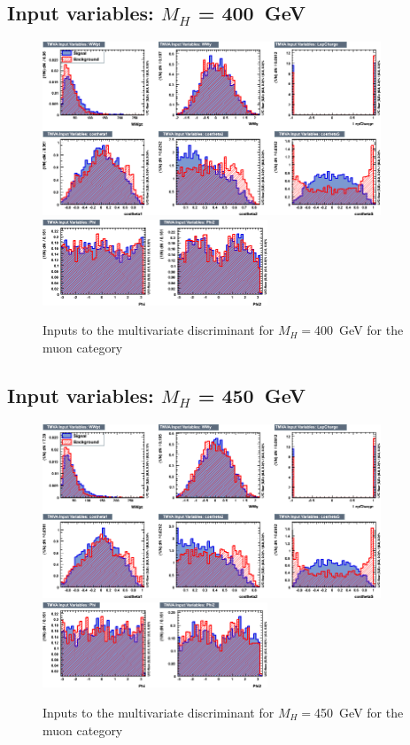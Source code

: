 \subsection{Input variables: \texorpdfstring{$M_H$}{M(H)} = 400~GeV}
\begin{figure}[ht]
  \centering
  \includegraphics[width=0.9\textwidth]{plots/2012_MVA/TMVA_400_nJ2_mu_variables_id_c1.png}
  \includegraphics[width=0.6\textwidth]{plots/2012_MVA/TMVA_400_nJ2_mu_variables_id_c2.png}	
  \caption{\label{fig:inputs400mu}Inputs to the multivariate discriminant for $M_H = $400~GeV for the muon category}
\end{figure}
\newpage
\subsection{Input variables: \texorpdfstring{$M_H$}{M(H)} = 450~GeV}
\begin{figure}[ht]
  \centering
  \includegraphics[width=0.9\textwidth]{plots/2012_MVA/TMVA_450_nJ2_mu_variables_id_c1.png}
  \includegraphics[width=0.6\textwidth]{plots/2012_MVA/TMVA_450_nJ2_mu_variables_id_c2.png}	
  \caption{\label{fig:inputs450mu}Inputs to the multivariate discriminant for $M_H = $450~GeV for the muon category}
\end{figure}
\newpage
